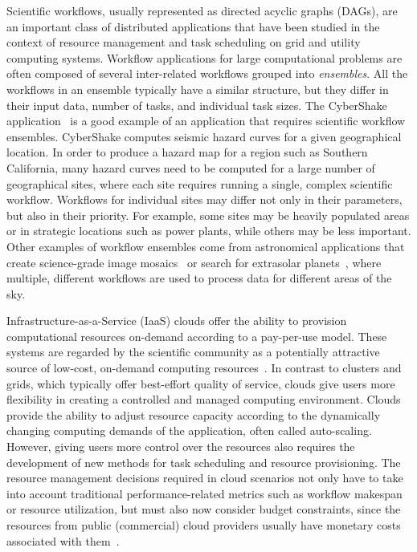 \documentclass{sig-alternate}
\begin{document}
Scientific workflows, usually represented as directed acyclic graphs (DAGs), are
an important class of distributed applications that have been studied in the context of
resource management and task scheduling on grid and utility computing systems.
Workflow applications for large computational problems are often composed of 
several inter-related workflows grouped into {\em ensembles}. All the
workflows in an ensemble typically have a similar structure, but they differ in their
input data, number of tasks, and individual task sizes. The CyberShake 
application~\cite{Callaghan11} is a good example of an application that requires 
scientific workflow ensembles. CyberShake computes seismic hazard curves for a given
geographical location. In order to produce a hazard map for a region such as 
Southern California, many hazard curves need to be computed for a large number of 
geographical sites, where each site requires running a single, complex scientific 
workflow. Workflows for individual sites may differ not only in their parameters, 
but also in their priority. For example, some sites may be heavily populated areas 
or in strategic locations such as power plants, while others may be less important. 
Other examples of workflow ensembles come from astronomical applications that create
science-grade image mosaics~\cite{Deelman08} or search for extrasolar 
planets~\cite{vockler11}, where multiple, different workflows are used to
process data for different areas of the sky.

Infrastructure-as-a-Service (IaaS) clouds offer the ability to provision 
computational resources on-demand according to a pay-per-use model. These systems 
are regarded by the scientific community as a potentially attractive source of 
low-cost, on-demand computing resources~\cite{Ostermann10,Keahey09}. In contrast 
to clusters and grids, which typically offer best-effort quality of service, clouds 
give users more flexibility in creating a controlled and managed computing environment.
Clouds provide the ability to adjust resource capacity according to the dynamically changing
computing demands of the application, often called auto-scaling. However, giving users 
more control over the resources also requires the development of new methods for task 
scheduling and resource provisioning. The resource management decisions required 
in cloud scenarios not only have to take into account traditional performance-related 
metrics such as workflow makespan or resource utilization, but must also now consider
budget constraints, since the resources from public (commercial) cloud providers 
usually have monetary costs associated with them~\cite{Durkee10}.
\end{document}
